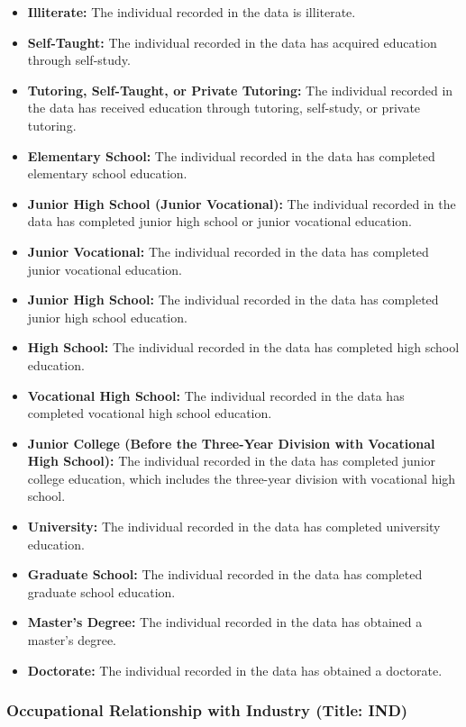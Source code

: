\documentclass[twocolumn]{article}
\begin{document}
\begin{itemize}
    \item \textbf{Illiterate:} The individual recorded in the data is illiterate.
    \item \textbf{Self-Taught:} The individual recorded in the data has acquired education through self-study.
    \item \textbf{Tutoring, Self-Taught, or Private Tutoring:} The individual recorded in the data has received education through tutoring, self-study, or private tutoring.
    \item \textbf{Elementary School:} The individual recorded in the data has completed elementary school education.
    \item \textbf{Junior High School (Junior Vocational):} The individual recorded in the data has completed junior high school or junior vocational education.
    \item \textbf{Junior Vocational:} The individual recorded in the data has completed junior vocational education.
    \item \textbf{Junior High School:} The individual recorded in the data has completed junior high school education.
    \item \textbf{High School:} The individual recorded in the data has completed high school education.
    \item \textbf{Vocational High School:} The individual recorded in the data has completed vocational high school education.
    \item \textbf{Junior College (Before the Three-Year Division with Vocational High School):} The individual recorded in the data has completed junior college education, which includes the three-year division with vocational high school.
    \item \textbf{University:} The individual recorded in the data has completed university education.
    \item \textbf{Graduate School:} The individual recorded in the data has completed graduate school education.
    \item \textbf{Master's Degree:} The individual recorded in the data has obtained a master's degree.
    \item \textbf{Doctorate:} The individual recorded in the data has obtained a doctorate.
\end{itemize}

	\subsubsection{Occupational Relationship with Industry (Title: IND)}
\end{document}
